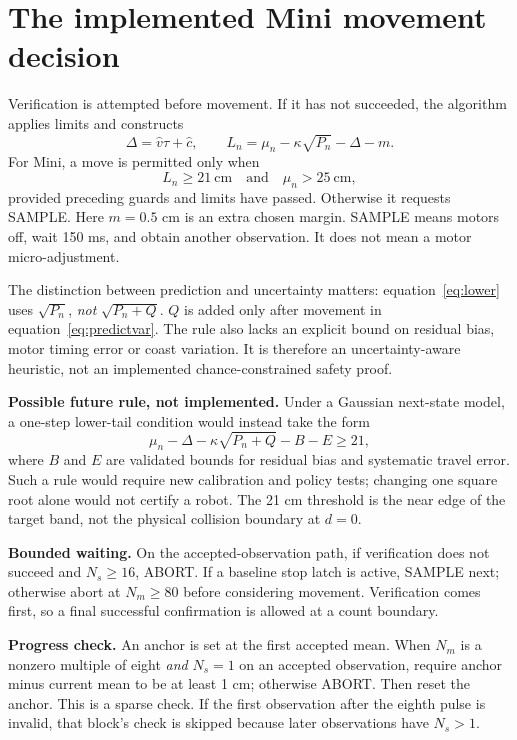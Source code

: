 \documentclass[11pt,a4paper]{article}
\begin{document}
\section{The implemented Mini movement decision}
Verification is attempted before movement. If it has not succeeded, the algorithm applies limits and constructs
\begin{equation}\label{eq:lower}
 \Delta=\hat v\tau+\hat c,\qquad
 L_n=\mu_n-\kappa\sqrt{P_n}-\Delta-m.
\end{equation}
For Mini, a move is permitted only when
\begin{equation}\label{eq:move}
 L_n\geq21\ \mathrm{cm}\quad\text{and}\quad\mu_n>25\ \mathrm{cm},
\end{equation}
provided preceding guards and limits have passed. Otherwise it requests SAMPLE. Here $m=0.5$ cm is an extra chosen margin. SAMPLE means motors off, wait 150 ms, and obtain another observation. It does not mean a motor micro-adjustment.

The distinction between prediction and uncertainty matters: equation~\eqref{eq:lower} uses $\sqrt{P_n}$, \emph{not} $\sqrt{P_n+Q}$. $Q$ is added only after movement in equation~\eqref{eq:predictvar}. The rule also lacks an explicit bound on residual bias, motor timing error or coast variation. It is therefore an uncertainty-aware heuristic, not an implemented chance-constrained safety proof.

\textbf{Possible future rule, not implemented.} Under a Gaussian next-state model, a one-step lower-tail condition would instead take the form
\begin{equation}\label{eq:future}
 \mu_n-\Delta-\kappa\sqrt{P_n+Q}-B-E\geq21,
\end{equation}
where $B$ and $E$ are validated bounds for residual bias and systematic travel error. Such a rule would require new calibration and policy tests; changing one square root alone would not certify a robot. The 21 cm threshold is the near edge of the target band, not the physical collision boundary at $d=0$.

\textbf{Bounded waiting.} On the accepted-observation path, if verification does not succeed and $N_s\geq16$, ABORT. If a baseline stop latch is active, SAMPLE next; otherwise abort at $N_m\geq80$ before considering movement. Verification comes first, so a final successful confirmation is allowed at a count boundary.

\textbf{Progress check.} An anchor is set at the first accepted mean. When $N_m$ is a nonzero multiple of eight \emph{and} $N_s=1$ on an accepted observation, require anchor minus current mean to be at least 1 cm; otherwise ABORT. Then reset the anchor. This is a sparse check. If the first observation after the eighth pulse is invalid, that block's check is skipped because later observations have $N_s>1$.
\end{document}
